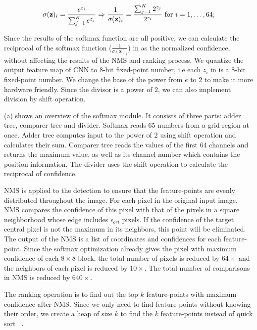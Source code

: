 \begin{equation}
    \small
    \sigma (\mathbf {z} )_{i}={\frac {e^{z_{i}}}{\sum _{j=1}^{K}e^{z_{j}}}}
    \Rightarrow
    \frac{1}{\sigma (\mathbf {z} )_{i}}={\frac {\sum _{j=1}^{K}2^{z_{j}}}{2^{z_{i}}}}{\text{ for }}i=1,\dotsc ,64;
    \label{equ:softmax_hard}
\end{equation}

Since the results of the softmax function are all positive, we can calculate the reciprocal of the softmax function ($\frac{1}{\sigma (\mathbf {z} )_{i}}$) in  as the normalized confidence, without affecting the results of the NMS and ranking process. We quantize the output feature map of CNN to 8-bit fixed-point number, i.e each $z_i$ in  is a 8-bit fixed-point number. We change the base of the power from $e$ to $2$ to make it more hardware friendly. Since the divisor is a power of $2$, we can also implement division by shift operation.

(a) shows an overview of the softmax module. It consists of three parts: adder tree, comparer tree and divider. Softmax reads 65 numbers from a grid region at once. Adder tree computes input to the power of $2$ using shift operation and calculates their sum. Comparer tree reads the values of the first 64 channels and returns the maximum value, as well as its channel number which contains the position information. The divider uses the shift operation to calculate the reciprocal of confidence.

NMS is applied to the detection to ensure that the feature-points are evenly distributed throughout the image. 
For each pixel in the original input image, NMS compares the confidence of this pixel with that of the pixels in a square neighborhood whose edge includes $\epsilon _{ori}$ pixels. 
If the confidence of the target central pixel is not the maximum in its neighbors, this point will be eliminated. 
The output of the NMS is a list of coordinates and confidences for each feature-point. 
Since the softmax optimization already gives the pixel with maximum confidence of each $8 \times 8$ block, the total number of pixels is reduced by $64 \times$ and the neighbors of each pixel is reduced by $10 \times$.
The total number of comparisons in NMS is reduced by $640\times$.

The ranking operation is to find out the top $k$ feature-points with maximum confidence after NMS. 
Since we only need to find feature-points without knowing their order, we create a heap of size $k$ to find the $k$ feature-points instead of quick sort ~\cite{Niu2012Top}.


